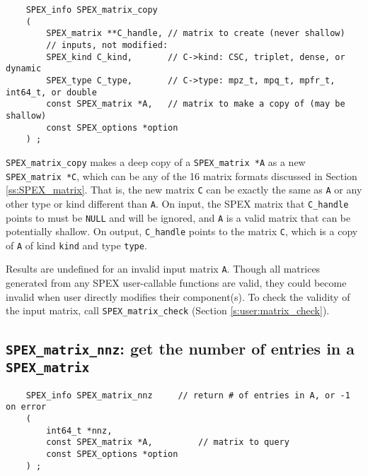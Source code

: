 \documentclass[12pt]{report}
\theoremstyle{definition}
\begin{document}
\begin{mdframed}[userdefinedwidth=6in]
{\footnotesize
\begin{verbatim}
    SPEX_info SPEX_matrix_copy
    (
        SPEX_matrix **C_handle, // matrix to create (never shallow)
        // inputs, not modified:
        SPEX_kind C_kind,       // C->kind: CSC, triplet, dense, or dynamic
        SPEX_type C_type,       // C->type: mpz_t, mpq_t, mpfr_t, int64_t, or double
        const SPEX_matrix *A,   // matrix to make a copy of (may be shallow)
        const SPEX_options *option
    ) ;
\end{verbatim}
} \end{mdframed}

\verb|SPEX_matrix_copy| makes a deep copy of a \verb|SPEX_matrix *A| as a new \verb|SPEX_matrix *C|, which can be any of the 16 matrix formats discussed in Section \ref{ss:SPEX_matrix}. That is, the new matrix \verb|C| can be exactly the same as \verb|A| or any other type or kind
different than \verb|A|.  On input, the SPEX matrix that \verb|C_handle| points to must be \verb|NULL| and will be ignored, and \verb|A| is a valid matrix that can be potentially shallow. On output, \verb|C_handle| points to the matrix
\verb|C|, which is a copy of \verb|A| of kind \verb|kind| and type \verb|type|. 


Results are undefined for an invalid input matrix \verb|A|. Though all matrices generated from any SPEX user-callable functions are valid, they could become invalid when user directly modifies their component(s). To check the validity of the input matrix, call
\verb|SPEX_matrix_check| (Section \ref{s:user:matrix_check}).

\subsection{\texttt{SPEX\_matrix\_nnz}: get the number of entries in a \texttt{SPEX\_matrix}}
\label{s:user:matrix_nnz}

\begin{mdframed}[userdefinedwidth=6in]
{\footnotesize
\begin{verbatim}
    SPEX_info SPEX_matrix_nnz     // return # of entries in A, or -1 on error
    (
        int64_t *nnz,
        const SPEX_matrix *A,         // matrix to query
        const SPEX_options *option
    ) ;
\end{verbatim}
} \end{mdframed}
\end{document}

